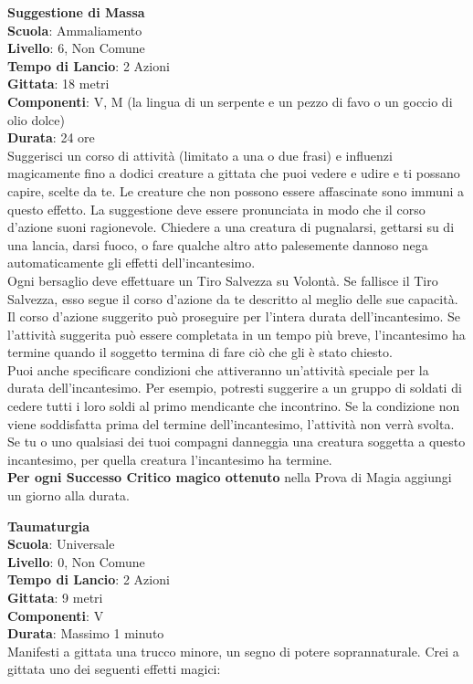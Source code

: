 \begin{multicols}{2}
\medskip\textbf{Suggestione di Massa}\\
\textbf{Scuola}: Ammaliamento\\
\textbf{Livello}: 6, Non Comune\\
\textbf{Tempo di Lancio}: 2 Azioni\\
\textbf{Gittata}: 18 metri\\
\textbf{Componenti}: V, M (la lingua di un serpente e un pezzo di favo o un goccio di olio dolce)\\
\textbf{Durata}: 24 ore\\
Suggerisci un corso di attività (limitato a una o due frasi) e influenzi magicamente fino a dodici creature a gittata che puoi vedere e udire e ti possano capire, scelte da te. Le creature che non possono essere affascinate sono immuni a questo effetto. La suggestione deve essere pronunciata in modo che il corso d'azione suoni ragionevole. Chiedere a una creatura di pugnalarsi, gettarsi su di una lancia, darsi fuoco, o fare qualche altro atto palesemente dannoso nega automaticamente gli effetti dell'incantesimo.\\
Ogni bersaglio deve effettuare un Tiro Salvezza su Volontà. Se fallisce il Tiro Salvezza, esso segue il corso d'azione da te descritto al meglio delle sue capacità. Il corso d'azione suggerito può proseguire per l'intera durata dell'incantesimo. Se l'attività suggerita può essere completata in un tempo più breve, l'incantesimo ha termine quando il soggetto termina di fare ciò che gli è stato chiesto.\\
Puoi anche specificare condizioni che attiveranno un'attività speciale per la durata dell'incantesimo. Per esempio, potresti suggerire a un gruppo di soldati di cedere tutti i loro soldi al primo mendicante che incontrino. Se la condizione non viene soddisfatta prima del termine dell'incantesimo, l'attività non verrà svolta. Se tu o uno qualsiasi dei tuoi compagni danneggia una creatura soggetta a questo incantesimo, per quella creatura l'incantesimo ha termine.\\
\textbf{Per ogni Successo Critico magico ottenuto} nella Prova di Magia aggiungi un giorno alla durata.

\medskip\textbf{Taumaturgia}\\
\textbf{Scuola}: Universale\\
\textbf{Livello}: 0, Non Comune\\
\textbf{Tempo di Lancio}: 2 Azioni\\
\textbf{Gittata}: 9 metri\\
\textbf{Componenti}: V\\
\textbf{Durata}: Massimo 1 minuto\\
Manifesti a gittata una trucco minore, un segno di potere soprannaturale. Crei a gittata uno dei seguenti effetti magici:\\


\end{multicols}
